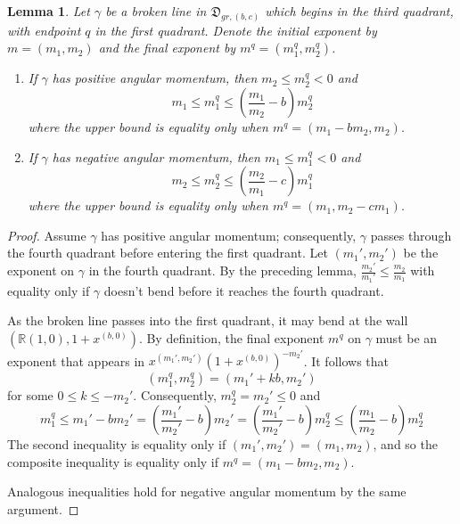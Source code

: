 \documentclass[10pt]{amsart}
\newtheorem{lemma}{Lemma}[section]
\theoremstyle{remark}
\numberwithin{equation}{section}
\begin{document}
\begin{lemma}
Let $\gamma$ be a broken line in $\mathfrak{D}_{gr,(b,c)}$ which begins in the third quadrant, with endpoint $q$ in the first quadrant.  Denote the  initial exponent by $m=(m_1,m_2)$ and the final exponent by $m^q=(m_1^q,m_2^q)$.  
\begin{enumerate}
	\item If $\gamma$ has positive angular momentum, then $m_2\leq m_2^q<0$ and
	\[ m_1\leq m_1^q\leq\left( \frac{m_1}{m_2}-b\right)m_2^q\]
	where the upper bound is equality only when $m^q =( m_1-bm_2,m_2)$.
	\item If $\gamma$ has negative angular momentum, then $m_1\leq  m_1^q<0$ and
	\[ m_2 \leq m_2^q\leq\left( \frac{m_2}{m_1}-c\right)m_1^q\]
	where the upper bound is equality only when $m^q =( m_1,m_2-cm_1)$.
\end{enumerate}
\end{lemma}
\begin{proof}
Assume $\gamma$ has positive angular momentum; consequently, $\gamma$ passes through the fourth quadrant before entering the first quadrant.  Let $(m_1',m_2')$ be the exponent on $\gamma$ in the fourth quadrant.  By the preceding lemma, $\frac{m_2'}{m_1'}\leq \frac{m_2}{m_1}$ with equality only if $\gamma$ doesn't bend before it reaches the fourth quadrant.  

As the broken line passes into the first quadrant, it may bend at the wall $(\mathbb{R}(1,0),1+x^{(b,0)})$.  By definition, the final exponent $m^q$ on $\gamma$ must be an exponent that appears in $x^{(m_1',m_2')}(1+x^{(b,0)})^{-m_2'}$.  It follows that%
\[ (m_1^q,m_2^q) = (m_1'+kb,m_2')\]
for some $0\leq k\leq -m_2'$.
Consequently, $m_2^q=m_2'\leq0$ and 
\[ m_1^q\leq m_1' - bm_2' = \left(\frac{m_1'}{m_2'} - b\right) m_2'  = \left(\frac{m_1'}{m_2'} - b\right) m_2^q \leq \left(\frac{m_1}{m_2} - b\right) m_2^q\]
The second inequality is equality only if $(m_1',m_2')=(m_1,m_2)$, and so the composite inequality is equality only if $m^q =( m_1-bm_2,m_2)$.

Analogous inequalities hold for negative angular momentum by the same argument.
\end{proof}
\end{document}
